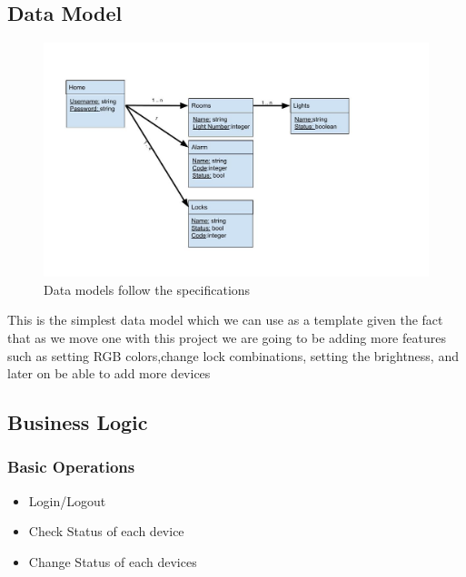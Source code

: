 \documentclass[11pt]{article}
\begin{document}
		\subsection{Data Model}
			\begin{figure}[H]
				\centering
				\includegraphics[scale=0.5]{data_model}
				\caption{Data models follow the specifications}
				\label{fig:datamodel}
			\end{figure}
			This is the simplest data model which we can use as a template given the fact that as we move one with this project we are going to be adding more features such as setting RGB colors,change lock combinations, setting the brightness, and later on be able to add more devices
		\subsection{Business Logic}
			\subsubsection{Basic Operations}
				\begin{itemize}
					\item Login/Logout
					\item Check Status of each device
					\item Change Status of each devices
				\end{itemize}
\end{document}

